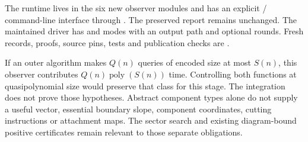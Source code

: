 The runtime lives in the six new  observer modules and has
an explicit / command-line interface through
. The preserved report remains
unchanged. The maintained driver
 has  and
 modes with an output path and optional rounds. Fresh
records, proofs, source pins, tests and publication checks are
.

If an outer algorithm makes $Q(n)$ queries of encoded size at most $S(n)$,
this observer contributes $Q(n)\operatorname{poly}(S(n))$ time. Controlling
both functions at quasipolynomial size would preserve that class for this
stage. The integration does not prove those hypotheses. Abstract component
types alone do not supply a useful vector, essential boundary slope,
component coordinates, cutting instructions or attachment maps. The sector
search and existing diagram-bound positive certificates remain relevant
to those separate obligations.
